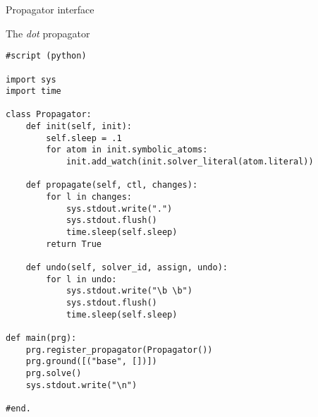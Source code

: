 \begin{frame}{Propagator interface}
\structure{}
\end{frame}
\begin{frame}[fragile,shrink=1]{The \textit{dot} propagator}
\begin{lstlisting}
#script (python)

import sys
import time

class Propagator:
    def init(self, init):
        self.sleep = .1
        for atom in init.symbolic_atoms:
            init.add_watch(init.solver_literal(atom.literal))

    def propagate(self, ctl, changes):
        for l in changes:
            sys.stdout.write(".")
            sys.stdout.flush()
            time.sleep(self.sleep)
        return True

    def undo(self, solver_id, assign, undo):
        for l in undo:
            sys.stdout.write("\b \b")
            sys.stdout.flush()
            time.sleep(self.sleep)

def main(prg):
    prg.register_propagator(Propagator())
    prg.ground([("base", [])])
    prg.solve()
    sys.stdout.write("\n")

#end.
\end{lstlisting}
\end{frame}
%
